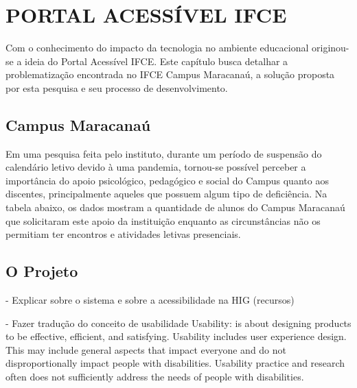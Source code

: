 
\chapter{PORTAL ACESSÍVEL IFCE}
\label{chap:portalIFCE}
Com o conhecimento do impacto da tecnologia no ambiente educacional originou-se a ideia do Portal Acessível IFCE. Este capítulo busca detalhar a problematização encontrada no IFCE Campus Maracanaú, a solução proposta por esta pesquisa e seu processo de desenvolvimento.

\section{Campus Maracanaú}
\label{sec:campus}


Em uma pesquisa feita pelo instituto, durante um período de suspensão do calendário letivo devido à uma pandemia, tornou-se possível perceber a importância do apoio psicológico, pedagógico e social do Campus quanto aos discentes, principalmente aqueles que possuem algum tipo de deficiência. Na tabela abaixo, os dados mostram a quantidade de alunos do Campus Maracanaú que solicitaram este apoio da instituição enquanto as circunstâncias não os permitiam ter encontros e atividades letivas presenciais.



 
\section{O Projeto}
\label{sec:projeto}

- Explicar sobre o sistema e sobre a acessibilidade na HIG (recursos)

- Fazer tradução do conceito de usabilidade 
Usability: is about designing products to be effective, efficient, and satisfying. Usability includes user experience design. This may include general aspects that impact everyone and do not disproportionally impact people with disabilities. Usability practice and research often does not sufficiently address the needs of people with disabilities.


